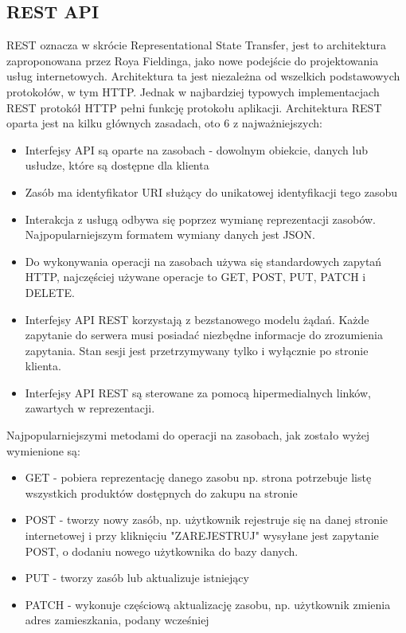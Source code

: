 \documentclass[12pt]{article}
\begin{document}
\begin{sloppypar}
{\subsection{REST API}
{
  REST oznacza w skrócie Representational State Transfer, jest to architektura zaproponowana przez Roya Fieldinga, jako nowe podejście do projektowania 
  usług internetowych. Architektura ta jest niezależna od wszelkich podstawowych protokołów, w tym HTTP. Jednak w najbardziej typowych implementacjach REST 
  protokół HTTP pełni funkcję protokołu aplikacji.\cite{mc-rest}
  Architektura REST oparta jest na kilku głównych zasadach, oto 6 z najważniejszych\cite{mc-rest}:
  \begin{itemize}
    \item Interfejsy API są oparte na zasobach - dowolnym obiekcie, danych lub usłudze, które są dostępne dla klienta
    \item Zasób ma identyfikator URI służący do unikatowej identyfikacji tego zasobu
    \item Interakcja z usługą odbywa się poprzez wymianę reprezentacji zasobów. Najpopularniejszym formatem wymiany danych jest JSON.
    \item Do wykonywania operacji na zasobach używa się standardowych zapytań HTTP, najczęściej używane operacje to GET, POST, PUT, PATCH i DELETE.
    \item Interfejsy API REST korzystają z bezstanowego modelu żądań. Każde zapytanie do serwera musi posiadać niezbędne informacje do zrozumienia zapytania. Stan sesji jest przetrzymywany tylko i wyłącznie po stronie klienta.
    \item Interfejsy API REST są sterowane za pomocą hipermedialnych linków, zawartych w reprezentacji.
  \end{itemize}
  Najpopularniejszymi metodami do operacji na zasobach, jak zostało wyżej wymienione są:
  \begin{itemize}
    \item GET - pobiera reprezentację danego zasobu np. strona potrzebuje listę wszystkich produktów dostępnych do zakupu na stronie
    \item POST - tworzy nowy zasób, np. użytkownik rejestruje się na danej stronie internetowej i przy kliknięciu "ZAREJESTRUJ" wysyłane jest zapytanie POST, o dodaniu nowego użytkownika do bazy danych.
    \item PUT - tworzy zasób lub aktualizuje istniejący
    \item PATCH - wykonuje częściową aktualizację zasobu, np. użytkownik zmienia adres zamieszkania, podany wcześniej

\end{itemize}}}
\end{sloppypar}
\end{document}
